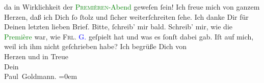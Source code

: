                da in Wirklichkeit der \textcolor{green}{\textsc{Premièren}-Abend}{} geweſen ſein! Ich freue mich von
                  \strikeout{\textcolor{gray}{Herz}} ganzem Herzen, {\pb}daß ich Dich ſo ſtolz und
               ſicher \strikeout{\textcolor{gray}{e}} weiterſchreiten ſehe.\pend
           \pstart
           Ich danke Dir für Deinen letzten lieben Brief. Bitte, ſchreib’ mir bald. Schreib’
               mir, wie die \textcolor{green}{Première}{} war, wie
                  \textsc{Frl. \textcolor{blue}{G.}{}\ledrightnote{\textcolor{blue}{Marie Glümer}}} geſpielt hat und was es ſonſt dabei gab.\pend
           \pstart
           Iſt \label{K_L02838-23v}\label{K_L02838-23h} auf
               mich, weil ich ihm nicht geſchrieben habe?\pend
           \pstart
           Ich begrüße Dich von {\\[\baselineskip]}Herzen und in Treue {\\[\baselineskip]}Dein {\\[\baselineskip]}\spacefill\mbox{Paul Goldmann.}\pend
           \leftskip=0em{}\endnumbering{}  
      